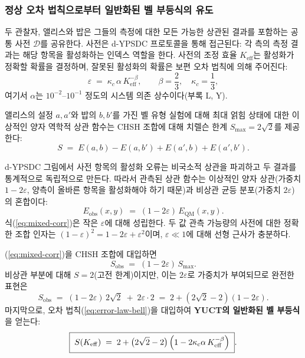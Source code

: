 \documentclass[12pt,a4paper]{article}
\begin{document}
	\subsubsection{정상 오차 법칙으로부터 일반화된 벨 부등식의 유도}
	\label{subsec:bell-derivation}
	
	두 관찰자, 앨리스와 밥은 그들의 측정에 대한 모든 가능한 상관된 결과를 포함하는 공통 사전 $\mathcal{D}$를 공유한다. 사전은 d-YPSDC 프로토콜을 통해 접근된다: 각 측의 측정 결과는 해당 항목을 활성화하는 인덱스 역할을 한다. 사전의 조정 효율 $K_{\mathrm{eff}}$는 활성화가 정확할 확률을 결정하며, 잘못된 활성화의 확률은 보편 오차 법칙에 의해 주어진다:
	\begin{equation}
		\varepsilon \;=\; \kappa_c\,\alpha\,K_{\mathrm{eff}}^{-\beta},
		\qquad \beta = \frac{2}{3},\quad \kappa_c = \frac{1}{3},
		\label{eq:error-law-bell}
	\end{equation}
	여기서 $\alpha$는 $10^{-2}$–$10^{-1}$ 정도의 시스템 의존 상수이다(부록 L, Y).
	
	앨리스의 설정 $a,a'$와 밥의 $b,b'$를 가진 벨 유형 실험에 대해 최대 얽힘 상태에 대한 이상적인 양자 역학적 상관 함수는 CHSH 조합에 대해 치렐슨 한계 $S_{\max}=2\sqrt{2}$를 제공한다:
	\[
	S \;=\; E(a,b)-E(a,b')+E(a',b)+E(a',b').
	\]
	
	d-YPSDC 그림에서 사전 항목의 활성화 오류는 비국소적 상관을 파괴하고 두 결과를 통계적으로 독립적으로 만든다. 따라서 관측된 상관 함수는 이상적인 양자 상관(가중치 $1-2\varepsilon$, 양측이 올바른 항목을 활성화해야 하기 때문)과 비상관 균등 분포(가중치 $2\varepsilon$)의 혼합이다:
	\begin{equation}
		E_{\mathrm{obs}}(x,y) \;=\; (1-2\varepsilon)\,E_{\mathrm{QM}}(x,y).
		\label{eq:mixed-corr}
	\end{equation}
	식(\ref{eq:mixed-corr})은 작은 $\varepsilon$에 대해 성립한다. 두 값 관측 가능량의 사전에 대한 정확한 조합 인자는 $(1-\varepsilon)^2 = 1-2\varepsilon + \varepsilon^2$이며, $\varepsilon\ll1$에 대해 선형 근사가 충분하다.
	
	(\ref{eq:mixed-corr})을 CHSH 조합에 대입하면
	\[
	S_{\mathrm{obs}} \;=\; (1-2\varepsilon)\,S_{\max}.
	\]
	비상관 부분에 대해 $S=2$(고전 한계)이지만, 이는 $2\varepsilon$로 가중치가 부여되므로 완전한 표현은
	\begin{equation}
		S_{\mathrm{obs}} \;=\; (1-2\varepsilon)\,2\sqrt{2} \;+\; 2\varepsilon\cdot 2
		\;=\; 2 + (2\sqrt{2}-2)(1-2\varepsilon).
		\label{eq:Sobs-intermediate}
	\end{equation}
	마지막으로, 오차 법칙(\ref{eq:error-law-bell})을 대입하여 \textbf{YUCT의 일반화된 벨 부등식}을 얻는다:
	\begin{equation}
		\boxed{\;
			S(K_{\mathrm{eff}}) \;=\; 2 + \bigl(2\sqrt{2}-2\bigr)\,
			\Bigl(1 - 2\kappa_c\alpha\,K_{\mathrm{eff}}^{-\beta}\Bigr)
			\;}.
		\label{eq:bell-generalised}
	\end{equation}
	
\end{document}
